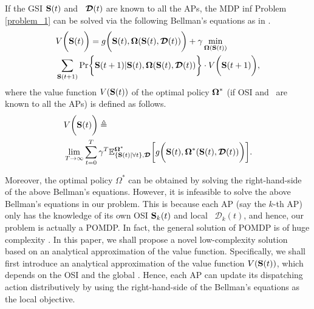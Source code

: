 If the GSI $\mathbf{S}(t)$ and \brlatency~$\boldsymbol{\mathcal{D}}(t)$ are known to all the APs, the MDP inf Problem \ref{problem_1} can be solved via the following Bellman's equations as in \cite{sutton1998}.
\begin{align}
    &V\Paren{\Stat(t)} =g\Paren{\Stat(t), \Policy(\Stat(t), \Delay(t))}
        + \gamma \min_{\Policy(\Stat(t))}
        \nonumber\\
        &\sum_{\Stat(t+1)} \Pr\Brace{ \Stat(t+1)|\Stat(t), \Policy(\Stat(t), \Delay(t)) } \cdot V\Paren{\Stat(t+1)},
    \label{eqn:sp_0}
\end{align}
where the value function $V(\mathbf{S}(t))$ of the optimal policy $\boldsymbol{\Omega}^{*}$ (if OSI and \brlatency~are known to all the APs) is defined as follows.
\begin{align}
    &V\bigg(\mathbf{S}(t)\bigg) \triangleq
    \nonumber\\
    &\lim_{T\to\infty} \sum_{t=0}^{T} \gamma^{T}
    \mathbb{E}^{\boldsymbol{\Omega}^*}_{\{\mathbf{S}(t)|\forall t\}, \boldsymbol{\mathcal{D}}} \bigg[
        g\bigg( \mathbf{S}(t), \boldsymbol{\Omega}^{*}(\mathbf{S}(t), \boldsymbol{\mathcal{D}}(t)) \bigg)
    \bigg].
\end{align}

Moreover, the optimal policy $\Omega^{*}$ can be obtained by solving the right-hand-side of the above Bellman's equations.
However, it is infeasible to solve the above Bellman's equations in our problem.
This is because each AP (say the $k$-th AP) only has the knowledge of its own OSI $\mathbf{S}_{k}(t)$ and local \brlatency~$\mathcal{D}_{k}(t)$, and hence, our problem is actually a POMDP.
In fact, the general solution of POMDP is of huge complexity \cite{IJCAI03-NairR,IJCAI99-BoutilierC}.
In this paper, we shall propose a novel low-complexity solution based on an analytical approximation of the value function.
Specifically, we shall first introduce an analytical approximation of the value function $V(\mathbf{S}(t))$, which depends on the OSI and the global \brlatency.
Hence, each AP can update its dispatching action distributively by using the right-hand-side of the Bellman's equations as the local objective.
